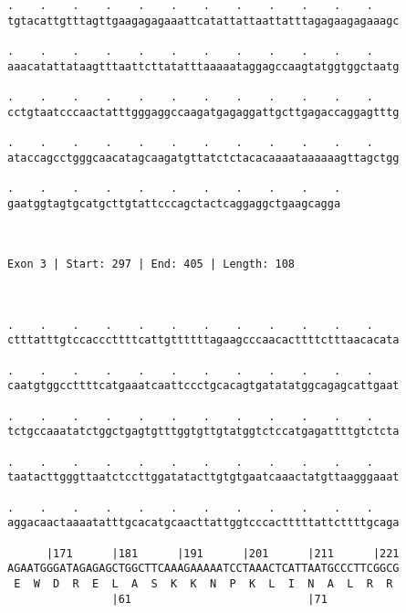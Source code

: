 \documentclass{article}
\begin{document}
\begin{Verbatim}
.    .    .    .    .    .    .    .    .    .    .    .    
tgtacattgtttagttgaagagagaaattcatattattaattatttagagaagagaaagc
                                                            
.    .    .    .    .    .    .    .    .    .    .    .    
aaacatattataagtttaattcttatatttaaaaataggagccaagtatggtggctaatg
                                                            
.    .    .    .    .    .    .    .    .    .    .    .    
cctgtaatcccaactatttgggaggccaagatgagaggattgcttgagaccaggagtttg
                                                            
.    .    .    .    .    .    .    .    .    .    .    .    
ataccagcctgggcaacatagcaagatgttatctctacacaaaataaaaaagttagctgg
                                                            
.    .    .    .    .    .    .    .    .    .    .
gaatggtagtgcatgcttgtattcccagctactcaggaggctgaagcagga
                                                   
                                                   
 
Exon 3 | Start: 297 | End: 405 | Length: 108



.    .    .    .    .    .    .    .    .    .    .    .    
ctttatttgtccacccttttcattgttttttagaagcccaacacttttctttaacacata
                                                            
.    .    .    .    .    .    .    .    .    .    .    .    
caatgtggccttttcatgaaatcaattccctgcacagtgatatatggcagagcattgaat
                                                            
.    .    .    .    .    .    .    .    .    .    .    .    
tctgccaaatatctggctgagtgtttggtgttgtatggtctccatgagattttgtctcta
                                                            
.    .    .    .    .    .    .    .    .    .    .    .    
taatacttgggttaatctccttggatatacttgtgtgaatcaaactatgttaagggaaat
                                                            
.    .    .    .    .    .    .    .    .    .    .    .    
aggacaactaaaatatttgcacatgcaacttattggtcccactttttattcttttgcaga
                                                            
      |171      |181      |191      |201      |211      |221
AGAATGGGATAGAGAGCTGGCTTCAAAGAAAAATCCTAAACTCATTAATGCCCTTCGGCG
 E  W  D  R  E  L  A  S  K  K  N  P  K  L  I  N  A  L  R  R 
                |61                           |71           
  

\end{Verbatim}
\end{document}
